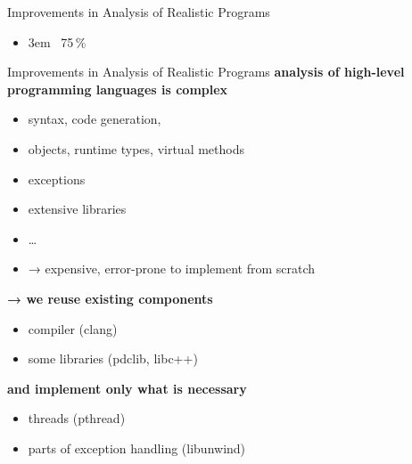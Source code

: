 \documentclass[aspectratio=169, fi]{paradise-slide}
\newcommand{\fcite}[1]{\emergencystretch 3em{\protect\NoHyper\cite{#1}}~\fullcite{#1}}
\newenvironment{prespart}[1]{%
  \begin{frame}{}%
    \centering
      {\Large #1} \par\bigskip\bigskip%
}{%
  \end{frame}%
}
\begin{document}
\begin{prespart}{Improvements in Analysis of Realistic Programs}
  \begin{itemize}
    \item \fcite{SRB2017} \hfill 75\,\%
  \end{itemize}
\end{prespart}

\begin{frame}{Improvements in Analysis of Realistic Programs}
  \textbf{analysis of high-level programming languages is complex} \pause
  \begin{itemize}
    \item syntax, code generation,
    \item objects, runtime types, virtual methods
    \item exceptions
    \item extensive libraries
    \item …
    \item → expensive, error-prone to implement from scratch
  \end{itemize}

  \pause\bigskip
  \textbf{→ we reuse existing components}
  \begin{itemize}
    \item compiler (clang)
    \item some libraries (pdclib, libc++)
  \end{itemize}

  \bigskip
  \textbf{and implement only what is necessary}
  \begin{itemize}
    \item threads (pthread)
    \item parts of exception handling (libunwind)
  \end{itemize}
\end{frame}
\end{document}
